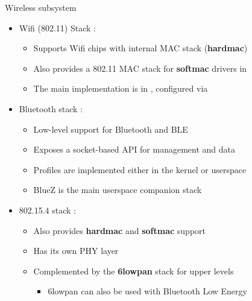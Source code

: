 \begin{frame}{Wireless subsystem}
	\begin{itemize}
		\item Wifi (802.11) Stack :
			\begin{itemize}
				\item Supports Wifi chips with internal MAC stack (\textbf{hardmac})
				\item Also provides a 802.11 MAC stack for \textbf{softmac} drivers in 
				\item The main implementation is in , configured via 
			\end{itemize}
		\item Bluetooth stack :
			\begin{itemize}
				\item Low-level support for Bluetooth and BLE
				\item Exposes a socket-based API for management and data
				\item Profiles are implemented either in the kernel or userspace
				\item BlueZ is the main userspace companion stack
			\end{itemize}
		\item 802.15.4 stack :
			\begin{itemize}
				\item Also provides \textbf{hardmac} and \textbf{softmac} support
				\item Has its own PHY layer
				\item Complemented by the \textbf{6lowpan} stack for upper levels
					\begin{itemize}
						\item 6lowpan can also be used with Bluetooth Low Energy
					\end{itemize}
			\end{itemize}
	\end{itemize}
\end{frame}

